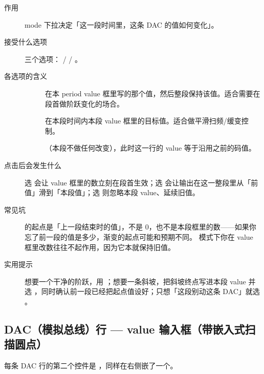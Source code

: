 \documentclass[11pt,oneside,openany]{book}
\begin{document}
\begin{description}
\item[作用] mode 下拉决定「这一段时间里，这条 DAC 的值如何变化」。
\item[接受什么选项] 三个选项： /  / 。
\item[各选项的含义]
  \begin{description}
  \item[] 在本 period  value 框里写的那个值，然后整段保持该值。适合需要在段首做阶跃变化的场合。
  \item[] 在本段时间内本段 value 框里的目标值。适合做平滑扫频/缓变控制。
  \item[] （本段不做任何改变），此时这一行的 value 等于沿用之前的码值。
  \end{description}
\item[点击后会发生什么] 选  会让 value 框里的数立刻在段首生效；选  会让输出在这一整段里从「前值」滑到「本段值」；选  则忽略本段 value、延续旧值。
\item[常见坑]  的起点是「上一段结束时的值」，不是 0，也不是本段框里的数——如果你忘了前一段的值是多少，渐变的起点可能和预期不同。 模式下你在 value 框里改数往往不起作用，因为它本就保持旧值。
\item[实用提示] 想要一个干净的阶跃，用 ；想要一条斜坡，把斜坡终点写进本段 value 并选 ，同时确认前一段已经把起点值设好；只想「这段别动这条 DAC」就选 。
\end{description}

\subsection{DAC（模拟总线）行 — value 输入框（带嵌入式扫描圆点）}

每条 DAC 行的第二个控件是 ，同样在右侧嵌了一个。
\end{document}
